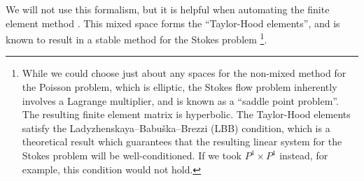 We will not use this formalism, but it is helpful when automating the finite element method \cite{automating_fem}.
This mixed space forms the ``Taylor-Hood elements'', and is known to result in a stable method for the Stokes problem \footnote{
While we could choose just about any spaces for the non-mixed method for the Poisson problem, which is elliptic, the Stokes flow problem
inherently involves a Lagrange multiplier, and is known as a ``saddle point problem''. The resulting finite element matrix is hyperbolic.
The Taylor-Hood elements satisfy the Ladyzhenskaya--Babu\v ska--Brezzi (LBB) condition, which
is a theoretical result which guarantees that the resulting linear system for the Stokes problem will be well-conditioned.
If we took $P^1 \times P^1$ instead, for example, this condition would not hold.
}.

% 
% 
